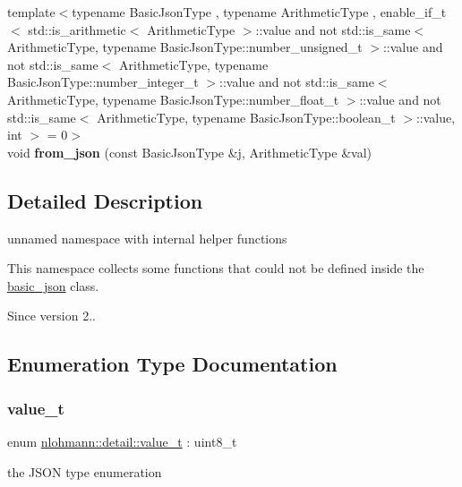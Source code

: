 \begin{DoxyCompactItemize}
{\footnotesize template$<$typename Basic\+Json\+Type , typename Arithmetic\+Type , enable\+\_\+if\+\_\+t$<$ std\+::is\+\_\+arithmetic$<$ Arithmetic\+Type $>$\+::value and not std\+::is\+\_\+same$<$ Arithmetic\+Type, typename Basic\+Json\+Type\+::number\+\_\+unsigned\+\_\+t $>$\+::value and not std\+::is\+\_\+same$<$ Arithmetic\+Type, typename Basic\+Json\+Type\+::number\+\_\+integer\+\_\+t $>$\+::value and not std\+::is\+\_\+same$<$ Arithmetic\+Type, typename Basic\+Json\+Type\+::number\+\_\+float\+\_\+t $>$\+::value and not std\+::is\+\_\+same$<$ Arithmetic\+Type, typename Basic\+Json\+Type\+::boolean\+\_\+t $>$\+::value, int $>$  = 0$>$ }\\void {\bfseries from\+\_\+json} (const Basic\+Json\+Type \&j, Arithmetic\+Type \&val)
\end{DoxyCompactItemize}


\subsection{Detailed Description}
unnamed namespace with internal helper functions 

This namespace collects some functions that could not be defined inside the \mbox{\hyperlink{classnlohmann_1_1basic__json}{basic\+\_\+json}} class.

\begin{DoxySince}{Since}
version 2.. 
\end{DoxySince}


\subsection{Enumeration Type Documentation}
\mbox{\label{namespacenlohmann_1_1detail_a90aa5ef615aa8305e9ea20d8a947980f}} 
\subsubsection{\texorpdfstring{value\_t}{value\_t}}
{\footnotesize\ttfamily enum \mbox{\hyperlink{namespacenlohmann_1_1detail_a90aa5ef615aa8305e9ea20d8a947980f}{nlohmann\+::detail\+::value\+\_\+t}} \+: uint8\+\_\+t\hspace{0.3cm}{\ttfamily [strong]}}



the J\+S\+ON type enumeration 

